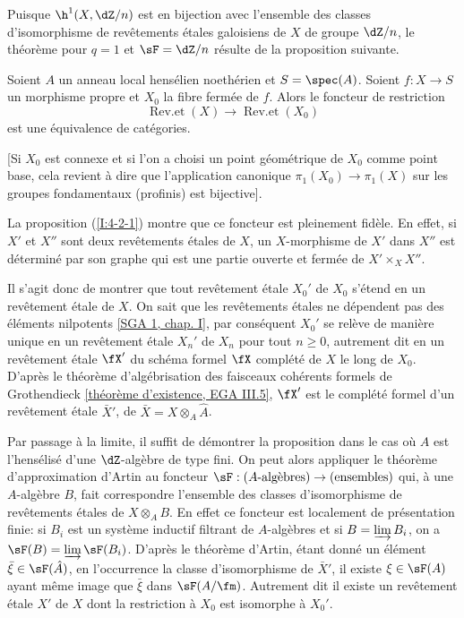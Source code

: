 Puisque $\h^1(X,\dZ/n)$ est en bijection avec l'ensemble des classes 
d'isomorphisme de revêtements étales galoisiens de $X$ de groupe $\dZ/n$, 
le théorème  pour $q=1$ et $\sF=\dZ/n$ résulte de la proposition suivante. 





\begin{propositiondotdash}\label{I:4-2-2}
Soient $A$ un anneau local hensélien noethérien et $S=\spec(A)$. Soient 
$f:X\to S$ un morphisme propre et $X_0$ la fibre fermée de $f$. Alors le 
foncteur de restriction 
\[
  \operatorname{Rev.et}(X) \to \operatorname{Rev.et}(X_0)
\]
est une équivalence de catégories. 
\end{propositiondotdash}

[Si $X_0$ est connexe et si l'on a choisi un point géométrique de $X_0$ 
comme point base, cela revient à dire que l'application canonique 
$\pi_1(X_0)\to \pi_1(X)$ sur les groupes fondamentaux (profinis) est 
bijective]. 

La proposition (\ref{I:4-2-1}) montre que ce foncteur est pleinement fidèle. En 
effet, si $X'$ et $X''$ sont deux revêtements étales de $X$, un 
$X$-morphisme de $X'$ dans $X''$ est déterminé par son graphe qui est une 
partie ouverte et fermée de $X'\times_X X''$. 

Il s'agit donc de montrer que tout revêtement étale $X_0'$ de $X_0$ s'étend 
en un revêtement étale de $X$. On sait que les revêtements étales ne 
dépendent pas des éléments nilpotents \hyperlink{cite.sga1}{[SGA 1, chap. I]}, par conséquent 
$X_0'$ se relève de manière unique en un revêtement étale $X_n'$ de 
$X_n$ pour tout $n\geqslant 0$, autrement dit en un revêtement étale 
$\fX'$ du schéma formel $\fX$ complété de $X$ le long de $X_0$. D'après 
le théorème d'algébrisation des faisceaux cohérents formels de 
Grothendieck \hyperlink{cite.ega}{[théorème d'existence, EGA III.5]}, $\fX'$ est le 
complété formel d'un revêtement étale $\bar X'$, de 
$\bar X=X\otimes_A \hat A$. 

Par passage à la limite, il suffit de démontrer la proposition dans le cas 
où $A$ est l'hensélisé d'une $\dZ$-algèbre de type fini. On peut alors 
appliquer le théorème d'approximation d'Artin au foncteur 
$\sF:(\textnormal{$A$-algèbres}) \to (\textnormal{ensembles})$ qui, à une 
$A$-algèbre $B$, fait correspondre l'ensemble des classes d'isomorphisme de 
revêtements étales de $X\otimes_A B$. En effet ce foncteur est localement de 
présentation finie: si $B_i$ est un système inductif filtrant de 
$A$-algèbres et si $B=\varinjlim B_i$, on a $\sF(B) = \varinjlim \sF(B_i)$. 
D'après le théorème d'Artin, étant donné un élément 
$\bar\xi\in \sF(\hat A)$, en l'occurrence la classe d'isomorphisme de $\bar X'$, il 
existe $\xi\in \sF(A)$ ayant même image que $\bar\xi$ dans $\sF(A/\fm)$. 
Autrement dit il existe un revêtement étale $X'$ de $X$ dont la restriction 
à $X_0$ est isomorphe à $X_0'$. 










